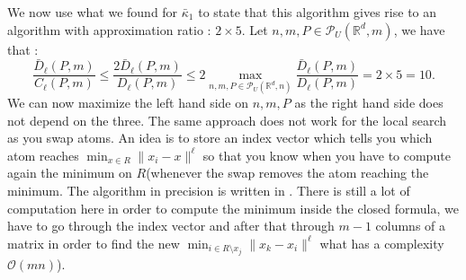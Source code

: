 \documentclass{amsart}
\newcommand{\RR}{\mathbb{R}}
\begin{document}
We now use what we found for $\bar\kappa_1$ to state that this algorithm gives rise to an algorithm with approximation ratio : $2\times 5$. Let $n,m,P\in\mathcal{P}_U\left(\RR^d,m\right)$, we have that : 
$$
\frac{\bar{D}_\ell\left(P,m\right)}{C_\ell\left(P,m\right)}\leq \frac{2\bar{D}_\ell\left(P,m\right)}{D_\ell\left(P,m\right)}\leq 2\max_{n,m,P\in\mathcal{P}_U(\RR^d,n)}\frac{\bar{D}_\ell\left(P,m\right)}{D_\ell\left(P,m\right)}=2\times5=10.
$$
We can now maximize the left hand side on $n,m,P$ as the right hand side does not depend on the three.
The same approach does not work for the local search as you swap atoms. An idea is to store an index vector which tells you which atom reaches $\min_{x\in R}\lVert x_i-x\rVert^\ell$ so that you know when you have to compute again the minimum on $R$(whenever the swap removes the atom reaching the minimum. The algorithm in precision is written in . There is still a lot of computation here in order to compute the minimum inside the closed formula, we have to go through the index vector and after that through $m-1$ columns of a matrix in order to find the new $\min_{i\in R\setminus x_j}\lVert x_k-x_i\rVert^\ell$ what has a complexity $\mathcal{O}\left(mn\right)$).
\clearpage
\end{document}
